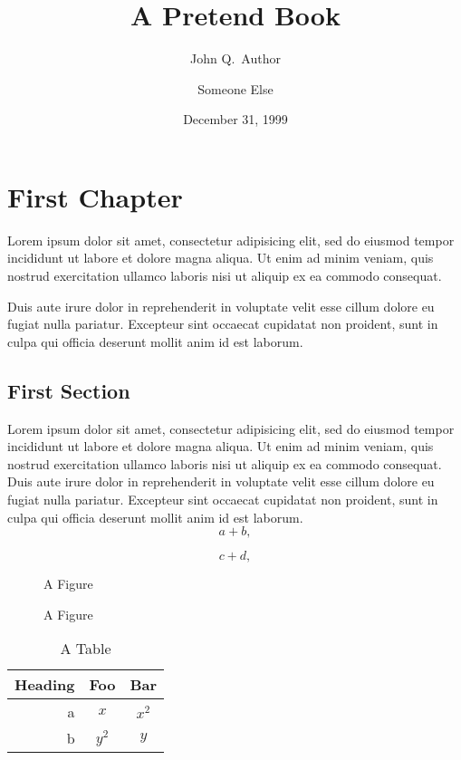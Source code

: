 \documentclass{book}
\title{A Pretend Book}
\author{John Q.~Author\and Someone Else}
\date{December 31, 1999}
\begin{document}
\maketitle
\chapter{First Chapter}
Lorem ipsum dolor sit amet, consectetur adipisicing elit, sed do eiusmod tempor incididunt ut labore et dolore magna aliqua. Ut enim ad minim veniam, quis nostrud exercitation ullamco laboris nisi ut aliquip ex ea commodo consequat.

Duis aute irure dolor in reprehenderit in voluptate velit esse cillum dolore eu fugiat nulla pariatur. Excepteur sint occaecat cupidatat non proident, sunt in culpa qui officia deserunt mollit anim id est laborum.

\section{First Section}
Lorem ipsum dolor sit amet, consectetur adipisicing elit, sed do eiusmod tempor incididunt ut labore et dolore magna aliqua. Ut enim ad minim veniam, quis nostrud exercitation ullamco laboris nisi ut aliquip ex ea commodo consequat. Duis aute irure dolor in reprehenderit in voluptate velit esse cillum dolore eu fugiat nulla pariatur. Excepteur sint occaecat cupidatat non proident, sunt in culpa qui officia deserunt mollit anim id est laborum.
\begin{equation}
 a + b,
\end{equation}

\begin{equation}
 c + d,
\end{equation}

\begin{figure}
\begin{centering}
A Figure\\
\end{centering}
\caption{A Figure}
\end{figure}

\begin{table}
\begin{centering}
\begin{tabular}{r|cc}
Heading & Foo & Bar\\\hline
a & $x$ & $x^2$\\
b & $y^2$ & $y$\\
\end{tabular}\\
\end{centering}
\caption{A Table}
\end{table}
\end{document}
